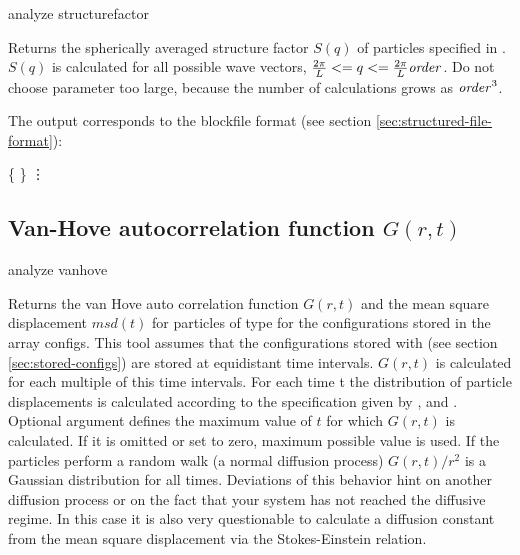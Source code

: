 \begin{pysyntax}
\end{pysyntax}

\begin{essyntax}
  analyze structurefactor  
\end{essyntax}

Returns the spherically averaged structure factor $S(q)$ of particles
specified in . $S(q)$ is calculated for all possible
wave vectors, $\frac{2\pi}{L} <= q <= \frac{2\pi}{L}\mathrm{\mathit{order}}$. Do
not choose parameter  too large, because the number of
calculations grows as $\mathrm{\mathit{order}}^3$. 



The output corresponds to the blockfile format (see section
\vref{sec:structured-file-format}):
\begin{code}
\{   \} 
\vdots
\end{code}

\subsection{Van-Hove autocorrelation function $G(r,t)$}
\label{analyze:vanhove}
\begin{essyntax}
  analyze vanhove    
\end{essyntax}
Returns the van Hove auto correlation function $G(r,t)$ and the mean
square displacement $msd(t)$ for particles of type  for the
configurations stored in the array configs. This tool assumes that the
configurations stored with  (see section
\vref{sec:stored-configs}) are stored at equidistant time intervals.
$G(r,t)$ is calculated for each multiple of this time intervals. For
each time t the distribution of particle displacements is calculated
according to the specification given by ,  and
. Optional argument  defines the maximum value
of $t$ for which $G(r,t)$ is calculated. If it is omitted or set to
zero, maximum possible value is used.
If the particles perform a random walk (\ie a normal
diffusion process) $G(r,t)/r^2$ is a Gaussian distribution for all
times.  Deviations of this behavior hint on another diffusion process
or on the fact that your system has not reached the diffusive regime.
In this case it is also very questionable to calculate a diffusion
constant from the mean square displacement via the Stokes-Einstein
relation. 

